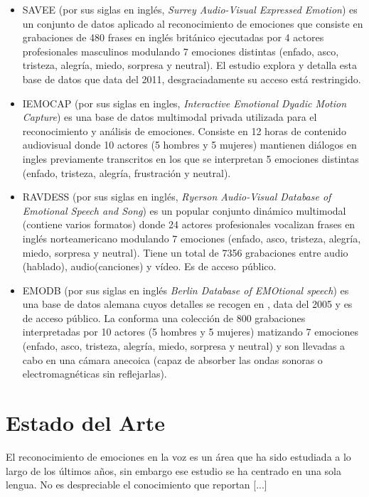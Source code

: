 \documentclass[11pt,a4paper,spanish]{book}
\begin{document}
	\begin{itemize}
		\item SAVEE (por sus siglas en inglés, \emph{ Surrey Audio-Visual Expressed Emotion}) es un conjunto de datos aplicado al reconocimiento de emociones que consiste en grabaciones de 480 frases en inglés británico ejecutadas por 4 actores profesionales masculinos modulando 7 emociones distintas (enfado, asco, tristeza, alegría, miedo, sorpresa y neutral). El estudio \cite{SAVEEdataset} explora y detalla esta base de datos que data del 2011, desgraciadamente su acceso está restringido.
		
		\item IEMOCAP (por sus siglas en ingles, \emph{Interactive Emotional Dyadic Motion Capture}) es una base de datos multimodal privada utilizada para el reconocimiento y análisis de emociones. Consiste en 12 horas de contenido audiovisual donde 10 actores (5 hombres y 5 mujeres) mantienen diálogos en ingles previamente transcritos en los que se interpretan 5 emociones distintas (enfado, tristeza, alegría, frustración y neutral).
		
		\item RAVDESS (por sus siglas en inglés, \emph{Ryerson Audio-Visual Database of Emotional Speech and Song}) es un popular conjunto dinámico multimodal (contiene varios formatos) donde 24 actores profesionales vocalizan frases en inglés norteamericano modulando 7 emociones (enfado, asco, tristeza, alegría, miedo, sorpresa y neutral). Tiene un total de 7356 grabaciones entre audio (hablado), audio(canciones) y vídeo. Es de acceso público.
		
		\item EMODB (por sus siglas en inglés \emph{Berlin Database of EMOtional speech}) es una base de datos alemana cuyos detalles se recogen en \cite{emodb2005}, data del 2005 y es de acceso público. La conforma una colección de 800 grabaciones interpretadas por 10 actores (5 hombres y 5 mujeres) matizando 7 emociones (enfado, asco, tristeza, alegría, miedo, sorpresa y neutral) y son llevadas a cabo en una cámara anecoica (capaz de absorber las ondas sonoras o electromagnéticas sin reflejarlas).
		
	\end{itemize}

	

	
	\section{Estado del Arte}
	\label{lb_estado_arte}
	El reconocimiento de emociones en la voz es un área que ha sido estudiada a lo largo de los últimos años, sin embargo ese estudio se ha centrado en una sola lengua.
	No es despreciable el conocimiento que reportan [...]
\end{document}

